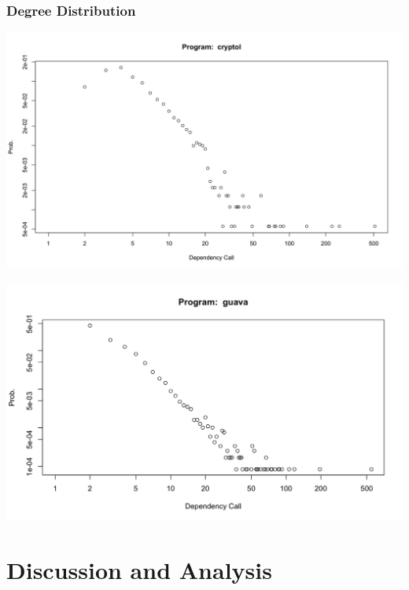 \documentclass[12pt, a4paper]{article}
\begin{document}
\subsubsection{Degree Distribution}
  
\begin{minipage}[t]{\linewidth}
    \includegraphics[width=\textwidth]{power_law_fp.png}
    \captionsetup{type=figure}
    \label{fig:power_law_fp}
  \end{minipage}

  \begin{minipage}[t]{\linewidth}
    \includegraphics[width=\textwidth]{power_law_oop.png}
    \captionsetup{type=figure}
    \label{fig:power_law_oop}
  \end{minipage}




\section{Discussion and Analysis}
\end{document}
